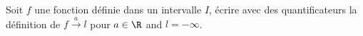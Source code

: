 Soit $f$ une fonction d\'efinie dans un intervalle $I$, \'ecrire avec des quantificateurs la d\'efinition de
$f\stackrel{a}{\rightarrow}l$ pour $a\in \R$ and $l=-\infty$.\bigskip